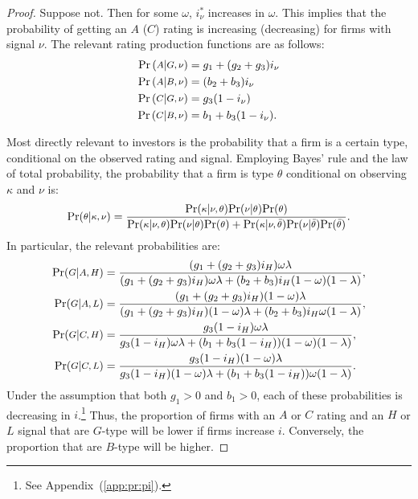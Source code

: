 \documentclass[titlepage]{article}
\begin{document}
\begin{proof}
Suppose not. Then for some $\omega$, $i^{*}_{\nu}$ increases in $\omega$. This implies that the probability of getting an $A$ ($C$) rating is increasing (decreasing) for firms with signal $\nu$. The relevant rating production functions are as follows:
\begin{align*}
\textup{Pr}\left ( \medmath{A} | \medmath{G,\nu} \right) &= g_{1}+(g_{2}+g_{3})i_{\nu}\\
\textup{Pr}\left ( \medmath{A} | \medmath{B,\nu} \right) &= (b_{2}+b_{3})i_{\nu}\\
\textup{Pr}\left ( \medmath{C} | \medmath{G,\nu} \right) &= g_{3}(1-i_{\nu})\\
\textup{Pr}\left ( \medmath{C} | \medmath{B,\nu} \right) &= b_{1}+b_{3}(1-i_{\nu}).
\end{align*}

Most directly relevant to investors is the probability that a firm is a certain type, conditional on the observed rating and signal. Employing Bayes' rule and the law of total probability, the probability that a firm is type $\theta$ conditional on observing $\kappa$ and $\nu$ is:
\begin{equation*}
\textup{Pr}(\medmath{\theta}|\medmath{\kappa,\nu})=\frac{\textup{Pr}(\medmath{\kappa}|\medmath{\nu,\theta})\textup{Pr}(\medmath{\nu}|\medmath{\theta})\textup{Pr}(\medmath{\theta})}{\textup{Pr}(\medmath{\kappa}|\medmath{\nu,\theta})\textup{Pr}(\medmath{\nu}|\medmath{\theta})\textup{Pr}(\medmath{\theta})+\textup{Pr}(\medmath{\kappa}|\medmath{\nu,\bar{\theta}})\textup{Pr}(\medmath{\nu}|\medmath{\bar{\theta}})\textup{Pr}(\medmath{\bar{\theta}})}.
\end{equation*}
In particular, the relevant probabilities are:
\begin{align*}
\textup{Pr}(\medmath{G}|\medmath{A,H})&=%
\frac{(g_{1}+(g_{2}+g_{3})i_{H})\omega\lambda}{(g_{1}+(g_{2}+g_{3})i_{H})\omega\lambda+(b_{2}+b_{3})i_{H}(1-\omega)(1-\lambda)},\\
\textup{Pr}(\medmath{G}|\medmath{A,L})&=%
\frac{(g_{1}+(g_{2}+g_{3})i_{H})(1-\omega)\lambda}{(g_{1}+(g_{2}+g_{3})i_{H})(1-\omega)\lambda+(b_{2}+b_{3})i_{H}\omega(1-\lambda)},\\
\textup{Pr}(\medmath{G}|\medmath{C,H})&=%
\frac{g_{3}(1-i_{H})\omega\lambda}{g_{3}(1-i_{H})\omega\lambda+(b_{1}+b_{3}(1-i_{H}))(1-\omega)(1-\lambda)},\\
\textup{Pr}(\medmath{G}|\medmath{C,L})&=%
\frac{g_{3}(1-i_{H})(1-\omega)\lambda}{g_{3}(1-i_{H})(1-\omega)\lambda+(b_{1}+b_{3}(1-i_{H}))\omega(1-\lambda)}.
\end{align*}
Under the assumption that both $g_{1}>0$ and $b_{1}>0$, each of these probabilities is decreasing in $i$.\footnote{See Appendix~(\ref{app:pr:pi}).} Thus, the proportion of firms with an $A$ or $C$ rating and an $H$ or $L$ signal that are $G$-type will be lower if firms increase $i$. Conversely, the proportion that are $B$-type will be higher.


\end{proof}
\end{document}
